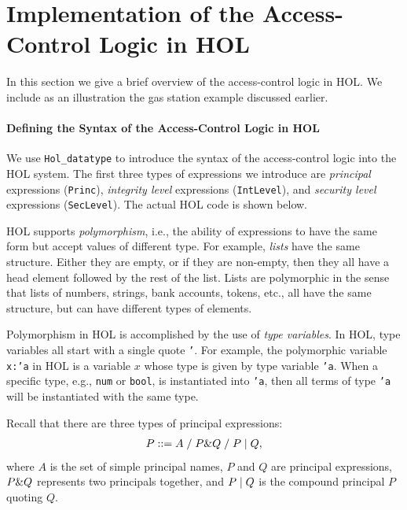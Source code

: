 \section{Implementation of the Access-Control Logic in HOL}
\label{sec:access-control-logic-hol}

In this section we give a brief overview of the access-control logic
in HOL. We include as an illustration the gas station example
discussed earlier.

\paragraph{Defining the Syntax of the Access-Control Logic in HOL}
\label{sec:defining-syntax-hol}

We use \texttt{Hol\_datatype} to introduce the syntax of the
access-control logic into the HOL system.  The first three types of
expressions we introduce are \emph{principal} expressions
(\texttt{Princ}), \emph{integrity level} expressions
(\texttt{IntLevel}), and \emph{security level} expressions
(\texttt{SecLevel}). The actual HOL code is shown below.

HOL supports \emph{polymorphism}, i.e., the ability of expressions to
have the same form but accept values of different type.  For example,
\emph{lists} have the same structure. Either they are empty, or if
they are non-empty, then they all have a head element followed by the
rest of the list.  Lists are polymorphic in the sense that lists of
numbers, strings, bank accounts, tokens, etc., all have the same
structure, but can have different types of elements.

Polymorphism in HOL is accomplished by the use of \emph{type
  variables}. In HOL, type variables all start with a single quote
\texttt{'}. For example, the polymorphic variable \texttt{x:'a} in HOL
is a variable $x$ whose type is given by type variable
\texttt{'a}. When a specific type, e.g., \texttt{num} or
\texttt{bool}, is instantiated into \texttt{'a}, then all terms of
type \texttt{'a} will be instantiated with the same type.

Recall that there are three types of principal expressions:
\begin{align*}
P ::= A \;/\; P \& Q \;/\; P\mid Q,
\end{align*}
where $A$ is the set of simple principal names, $P$ and $Q$ are
principal expressions, $P \& Q$ represents two principals together,
and $P \mid Q$ is the compound principal $P$ quoting $Q$.

